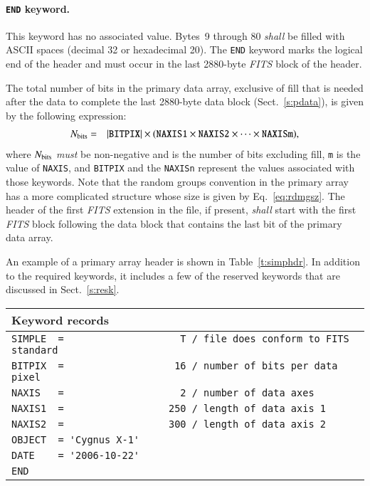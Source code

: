 \documentclass[onecolumn]{aa}
\begin{document}
   \paragraph{{\tt END} keyword.}
 This keyword has no associated value.  Bytes~9 through 80
 {\em shall} be filled with ASCII spaces (decimal 32 or hexadecimal 20).
 The {\tt END} keyword marks the logical end of the header and must occur
 in the last 2880-byte {\em FITS\/} block of the header.
\vspace{3mm}

 The total number of bits in the primary data array, 
 exclusive of fill that is needed after the data to complete the last 2880-byte data block 
 (Sect.\ \ref{s:pdata}), is given by the
 following expression:
\begin{eqnarray}  
   \mbox{$N_{\rm bits}$} &=&  
                     |\mbox{{\tt BITPIX}}|  \times 
                     (\mbox{{\tt NAXIS1}} \times 
                     \mbox{{\tt NAXIS2}} \times  \cdots \times 
                     \mbox{{\tt NAXISm}}),              \label{eq:prnbit}
\end{eqnarray}
 \noindent
 where $N_{\rm bits}$ {\em must} be
 non-negative and is the number of bits excluding fill, 
 {\tt m} is the value of {\tt NAXIS}, and
 {\tt BITPIX} and the {\tt NAXISn} represent 
 the values associated with those keywords.          
Note that the random groups convention in the primary array has a more
complicated structure whose size is given by Eq.~\ref{eq:rdmgsz}.
The header of the first {\em FITS\/} extension 
in the file, if present, {\em shall} start with the first {\em FITS\/} block following 
the data block that contains the last bit of the primary data array.

An example of a primary array header is shown in Table~\ref{t:simphdr}.  In addition
to the required keywords, it includes a few of the reserved keywords 
that are discussed in Sect.\ \ref{s:resk}.


\begin{table*}
\centering
\caption{Example of a primary array header.}
\label{t:simphdr}
\begin{tabular}{l} 
\hline \hline
Keyword records \\
\hline
{\verb+SIMPLE  =                    T / file does conform to FITS standard+} \\
{\verb+BITPIX  =                   16 / number of bits per data pixel+} \\
{\verb+NAXIS   =                    2 / number of data axes+} \\
{\verb+NAXIS1  =                  250 / length of data axis 1+} \\
{\verb+NAXIS2  =                  300 / length of data axis 2+} \\
{\verb+OBJECT  = 'Cygnus X-1'+} \\
{\verb+DATE    = '2006-10-22'+} \\
{\verb+END+} \\
\hline
\end{tabular}
\end{table*}
\end{document}
